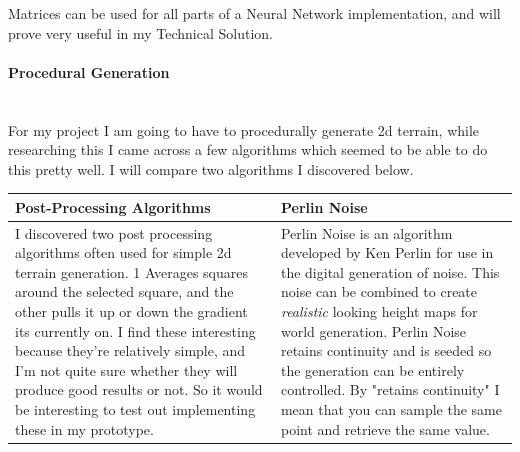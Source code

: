 \begin{flushleft}
                        Matrices can be used for all parts of a Neural Network implementation, and will prove very useful in my Technical
                        Solution. \\
                        \vspace{0.5cm}
                        
                        \pagebreak
                    \paragraph{Procedural Generation} \mbox{} \\
                        \vspace{0.2cm}
                        For my project I am going to have to procedurally generate 2d terrain, while researching this I came across a few algorithms
                        which seemed to be able to do this pretty well. I will compare two algorithms I discovered below.
                        
                        \begin{center}
                            \begin{tabular}{| C{6cm} | C{6cm} |}
                                \hline
                                {\Large Post-Processing Algorithms} & {\Large Perlin Noise} \\
                                \hline
                                I discovered two post processing algorithms often used for simple 2d terrain generation. 1 Averages squares 
                                around the selected square, and the other pulls it up or down the gradient its currently on.
                                I find these interesting because they're relatively simple, and I'm not quite sure whether they will produce good results or not. 
                                \vspace{0.2cm}\linebreak
                                So it would be interesting to test out implementing these in my prototype.
                                &
                                Perlin Noise is an algorithm developed by Ken Perlin for use in the digital generation of noise.
                                This noise can be combined to create \textit{realistic} looking height maps for world generation.
                                Perlin Noise retains continuity and is seeded so the generation can be entirely controlled.
                                By "retains continuity" I mean that you can sample the same point and retrieve the same value. 
                                \vspace{0.2cm}\linebreak
                                

\end{tabular}
\end{center}
\end{flushleft}
